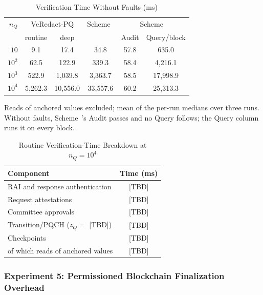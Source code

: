 \documentclass[lettersize,journal]{IEEEtran}
\begin{document}
\begin{table}[t]\color{e4}
\centering
\caption{Verification Time Without Faults (ms)}
\label{tab:exp4_nofault}
\scriptsize
\renewcommand{\arraystretch}{1.08}
\setlength{\tabcolsep}{3pt}
\begin{tabular}{rccccc}
\hline
$n_Q$ & \multicolumn{2}{c}{VeRedact-PQ} & Scheme~\cite{ref1} & \multicolumn{2}{c}{Scheme~\cite{ref13}} \\
 & routine & deep & & Audit & Query/block \\
\hline
$10$   & 9.1       & 17.4       & 34.8       & 57.8 & 635.0      \\
$10^2$ & 62.5      & 122.9      & 339.3      & 58.4 & 4{,}216.1  \\
$10^3$ & 522.9     & 1{,}039.8  & 3{,}363.7  & 58.5 & 17{,}998.9 \\
$10^4$ & 5{,}262.3 & 10{,}556.0 & 33{,}557.6 & 60.2 & 25{,}313.3 \\
\hline
\end{tabular}

\smallskip
\parbox{0.95\linewidth}{\tiny Reads of anchored values excluded; mean of
the per-run medians over three runs. Without faults, Scheme~\cite{ref13}'s
Audit passes and no Query follows; the Query column runs it on every
block.}
\end{table}

\begin{table}[t]\color{e4}
\centering
\caption{Routine Verification-Time Breakdown at $n_Q=10^4$}
\label{tab:exp4_breakdown}
\scriptsize
\renewcommand{\arraystretch}{1.08}
\setlength{\tabcolsep}{4pt}
\begin{tabular}{lc}
\hline
Component & Time (ms) \\
\hline
RAI and response authentication & [TBD] \\
Request attestations & [TBD] \\
Committee approvals & [TBD] \\
Transition/PQCH ($z_Q=$ [TBD]) & [TBD] \\
Checkpoints & [TBD] \\
\hline
of which reads of anchored values & [TBD] \\
\hline
\end{tabular}
\end{table}

    
 \subsubsection*{\textbf{Experiment 5: Permissioned Blockchain Finalization Overhead}}
\end{document}
